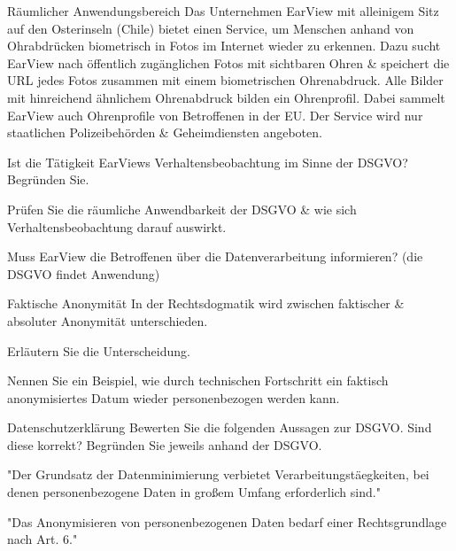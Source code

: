 \documentclass{exercisesheet}
\begin{document}
\begin{exercise*}{Räumlicher Anwendungsbereich}{
    Das Unternehmen EarView mit alleinigem Sitz auf den Osterinseln (Chile) bietet einen Service, um Menschen anhand von Ohrabdrücken biometrisch in Fotos im Internet wieder zu erkennen. Dazu sucht EarView nach öffentlich zugänglichen Fotos mit sichtbaren Ohren \& speichert die URL jedes Fotos zusammen mit einem biometrischen Ohrenabdruck. Alle Bilder mit hinreichend ähnlichem Ohrenabdruck bilden ein Ohrenprofil. Dabei sammelt EarView auch Ohrenprofile von Betroffenen in der EU. Der Service wird nur staatlichen Polizeibehörden \& Geheimdiensten angeboten.
  }
  \item Ist die Tätigkeit EarViews Verhaltensbeobachtung im Sinne der DSGVO? Begründen Sie.
  \item Prüfen Sie die räumliche Anwendbarkeit der DSGVO \& wie sich Verhaltensbeobachtung darauf auswirkt.
  \item Muss EarView die Betroffenen über die Datenverarbeitung informieren? (die DSGVO findet Anwendung)
\end{exercise*}

\begin{exercise*}{Faktische Anonymität}{
    In der Rechtsdogmatik wird zwischen faktischer \& absoluter Anonymität unterschieden.
  }
  \item Erläutern Sie die Unterscheidung.
  \item Nennen Sie ein Beispiel, wie durch technischen Fortschritt ein faktisch anonymisiertes Datum wieder personenbezogen werden kann.
\end{exercise*}

\begin{exercise*}[2]{Datenschutzerklärung}{
    Bewerten Sie die folgenden Aussagen zur DSGVO. Sind diese korrekt? Begründen Sie jeweils anhand der DSGVO.
  }
  \item "Der Grundsatz der Datenminimierung verbietet Verarbeitungstäegkeiten, bei denen personenbezogene Daten in großem Umfang erforderlich sind."
  \item "Das Anonymisieren von personenbezogenen Daten bedarf einer Rechtsgrundlage nach Art. 6."
\end{exercise*}
\end{document}
